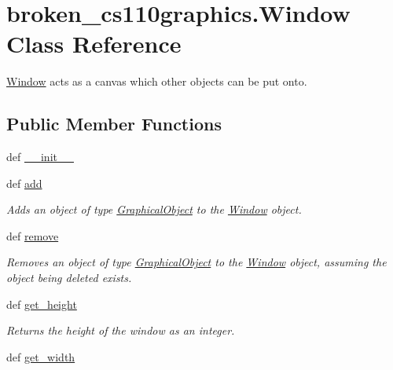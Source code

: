 \hypertarget{classbroken__cs110graphics_1_1Window}{
\section{broken\_\-cs110graphics.Window Class Reference}
\label{classbroken__cs110graphics_1_1Window}
}


\hyperlink{classbroken__cs110graphics_1_1Window}{Window} acts as a canvas which other objects can be put onto.  
\subsection*{Public Member Functions}
\begin{DoxyCompactItemize}
\item 
def \hyperlink{classbroken__cs110graphics_1_1Window_a7578fe4d1852c432b923521c8884d40a}{\_\-\_\-init\_\-\_\-}
\item 
def \hyperlink{classbroken__cs110graphics_1_1Window_a92dfe6c1d31614011e1f74527bb06c34}{add}
\begin{DoxyCompactList}\small\item\em Adds an object of type \hyperlink{classbroken__cs110graphics_1_1GraphicalObject}{GraphicalObject} to the \hyperlink{classbroken__cs110graphics_1_1Window}{Window} object. \item\end{DoxyCompactList}\item 
def \hyperlink{classbroken__cs110graphics_1_1Window_a8ffc7e3db2161bec17e0d56e9742c3c2}{remove}
\begin{DoxyCompactList}\small\item\em Removes an object of type \hyperlink{classbroken__cs110graphics_1_1GraphicalObject}{GraphicalObject} to the \hyperlink{classbroken__cs110graphics_1_1Window}{Window} object, assuming the object being deleted exists. \item\end{DoxyCompactList}\item 
def \hyperlink{classbroken__cs110graphics_1_1Window_a2f751d4a6af7ace7dc4e1ad4d4da865c}{get\_\-height}
\begin{DoxyCompactList}\small\item\em Returns the height of the window as an integer. \item\end{DoxyCompactList}\item 
def \hyperlink{classbroken__cs110graphics_1_1Window_a39e0c2a0ae7a86cf92928a2a5c515b37}{get\_\-width}

\end{DoxyCompactItemize}
